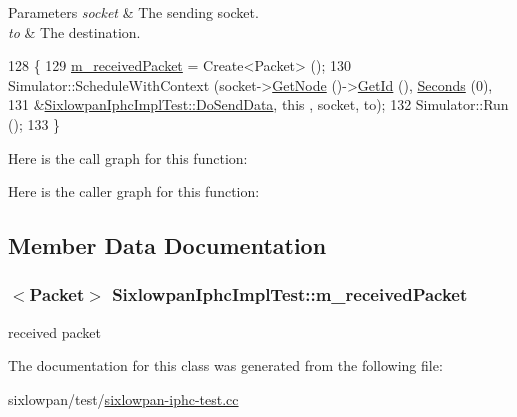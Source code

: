 \begin{DoxyParams}{Parameters}
{\em socket} & The sending socket. \\
\hline
{\em to} & The destination. \\
\hline
\end{DoxyParams}

\begin{DoxyCode}
128 \{
129   \hyperlink{classSixlowpanIphcImplTest_a1462936c804a6cdb9cd52ce499932df8}{m\_receivedPacket} = Create<Packet> ();
130   Simulator::ScheduleWithContext (socket->\hyperlink{classns3_1_1Socket_aba642ad4301c1df47befc0aa9afa2e48}{GetNode} ()->\hyperlink{classns3_1_1Node_aaf49b64a843565ce3812326313b370ac}{GetId} (), 
      \hyperlink{group__timecivil_ga33c34b816f8ff6628e33d5c8e9713b9e}{Seconds} (0),
131                                   &\hyperlink{classSixlowpanIphcImplTest_a73e2c04553c003fc96856d181bee897c}{SixlowpanIphcImplTest::DoSendData}, \textcolor{keyword}{this}
      , socket, to);
132   Simulator::Run ();
133 \}
\end{DoxyCode}


Here is the call graph for this function\+:




Here is the caller graph for this function\+:




\subsection{Member Data Documentation}
\subsubsection[{\texorpdfstring{m\+\_\+received\+Packet}{m_receivedPacket}}]{$<${\bf Packet}$>$ Sixlowpan\+Iphc\+Impl\+Test\+::m\+\_\+received\+Packet\hspace{0.3cm}{\ttfamily [private]}}\hypertarget{classSixlowpanIphcImplTest_a1462936c804a6cdb9cd52ce499932df8}{}\label{classSixlowpanIphcImplTest_a1462936c804a6cdb9cd52ce499932df8}


received packet 



The documentation for this class was generated from the following file\+:\begin{DoxyCompactItemize}
\item 
sixlowpan/test/\hyperlink{sixlowpan-iphc-test_8cc}{sixlowpan-\/iphc-\/test.\+cc}\end{DoxyCompactItemize}
